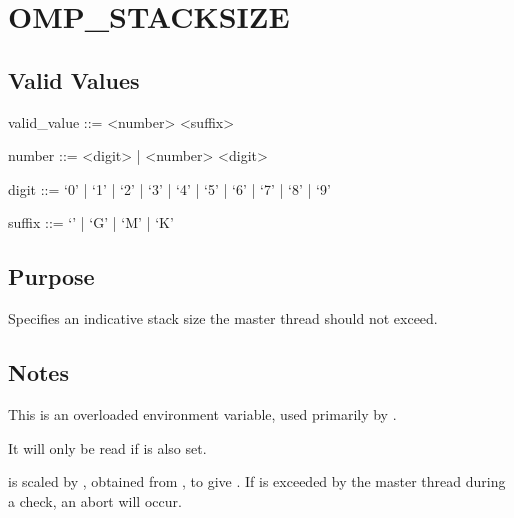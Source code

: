 \documentclass[letterpaper,10pt,english]{sphinxmanual}
\begin{document}
\section{OMP\_STACKSIZE}
\label{\detokenize{flag/flag:omp-stacksize}}\label{\detokenize{flag/flag:id3}}

\subsection{Valid Values}
\label{\detokenize{flag/flag:id4}}
\begin{DUlineblock}{0em}
\item[] valid\_value ::= \textless{}number\textgreater{} \textless{}suffix\textgreater{}
\item[] number ::= \textless{}digit\textgreater{} | \textless{}number\textgreater{} \textless{}digit\textgreater{}
\item[] digit ::= ‘0’ | ‘1’ | ‘2’ | ‘3’ | ‘4’ | ‘5’ | ‘6’ | ‘7’ | ‘8’ | ‘9’
\item[] suffix ::= ‘’ | ‘G’ | ‘M’ | ‘K’
\end{DUlineblock}


\subsection{Purpose}
\label{\detokenize{flag/flag:id5}}
\sphinxAtStartPar
Specifies an indicative stack size the master thread should not exceed.


\subsection{Notes}
\label{\detokenize{flag/flag:id6}}
\sphinxAtStartPar
This is an overloaded environment variable, used primarily by .

\sphinxAtStartPar
It will only be read if {\hyperref[\detokenize{flag/flag:dr-hook-trace-stack}]{}} is also set.

\sphinxAtStartPar
{} is scaled by , obtained from {\hyperref[\detokenize{flag/flag:dr-hook-trace-stack}]{}}, to give . If  is exceeded by the master thread during a  check, an abort will occur.
\end{document}
